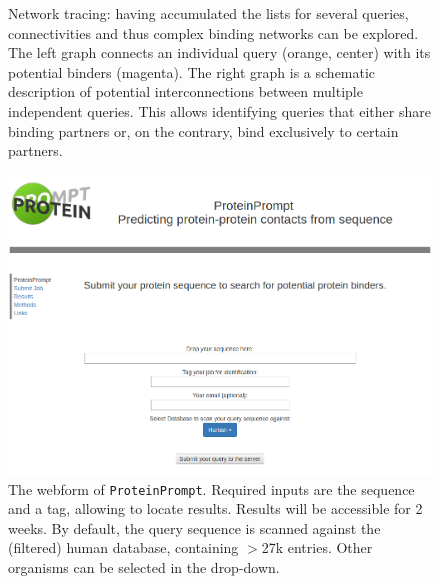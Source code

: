 \documentclass{article}
\newcommand{\tool}{\texttt{ProteinPrompt}}
\begin{document}
\begin{figure}
  
  \caption{Network tracing: having accumulated the lists for several queries, connectivities and thus complex binding networks can be explored.
   The left graph connects an individual query (orange, center) with its potential binders (magenta).
   The right graph is a schematic description of potential interconnections between multiple independent queries.
   This allows identifying queries that either share binding partners or, on the contrary, bind exclusively to certain partners. }
  \label{fig:connect}
\end{figure}

\begin{figure}
  \hspace{-1.5cm}\includegraphics[width=1.2\linewidth]{material/webform.png}
  \caption{ The webform of \tool.
    Required inputs are the sequence and a tag, allowing to locate results.
    Results will be accessible for 2 weeks.
    By default, the query sequence is scanned against the (filtered) human database, containing $>$27k entries.
    Other organisms can be selected in the drop-down.}
  \label{fig:webform}
\end{figure}


\clearpage


\end{document}
